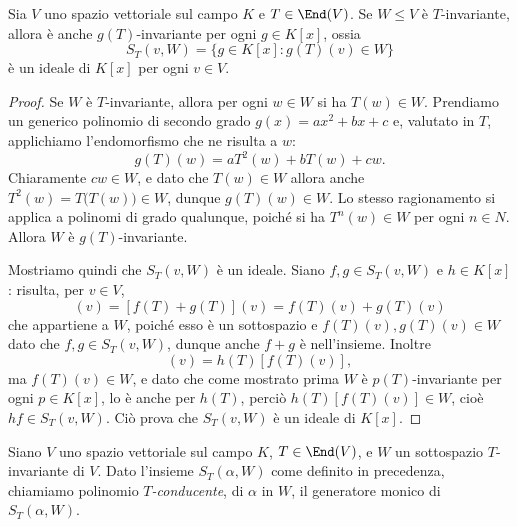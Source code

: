 \begin{lemma} \label{l:ideale-conducente}
	Sia $V$ uno spazio vettoriale sul campo $K$ e $T\in\End(V)$.
	Se $W\le V$ è $T$-invariante, allora è anche $g(T)$-invariante per ogni $g\in K[x]$, ossia
	\begin{equation*}
		S_T(v,W)=\{g\in K[x]\colon g(T)(v)\in W\}
	\end{equation*}
	è un ideale di $K[x]$ per ogni $v\in V$.
\end{lemma}
\begin{proof}
	Se $W$ è $T$-invariante, allora per ogni $w\in W$ si ha $T(w)\in W$.
	Prendiamo un generico polinomio di secondo grado $g(x)=ax^2+bx+c$ e, valutato in $T$, applichiamo l'endomorfismo che ne risulta a $w$:
	\begin{equation}
		g(T)(w)=aT^2(w)+bT(w)+cw.
	\end{equation}
	Chiaramente $cw\in W$, e dato che $T(w)\in W$ allora anche $T^2(w)=T\big(T(w)\big)\in W$, dunque $g(T)(w)\in W$.
	Lo stesso ragionamento si applica a polinomi di grado qualunque, poich\'e si ha $T^n(w)\in W$ per ogni $n\in N$.
	Allora $W$ è $g(T)$-invariante.

	Mostriamo quindi che $S_T(v,W)$ è un ideale.
	Siano $f,g\in S_T(v,W)$ e $h\in K[x]$: risulta, per $v\in V$,
	\begin{equation}
		[(f+g)(T)](v)=[f(T)+g(T)](v)=f(T)(v)+g(T)(v)
	\end{equation}
	che appartiene a $W$, poich\'e esso è un sottospazio e $f(T)(v),g(T)(v)\in W$ dato che $f,g\in S_T(v,W)$, dunque anche $f+g$ è nell'insieme.
	Inoltre
	\begin{equation*}
		[(hf)(T)](v)=h(T)[f(T)(v)],
	\end{equation*}
	ma $f(T)(v)\in W$, e dato che come mostrato prima $W$ è $p(T)$-invariante per ogni $p\in K[x]$, lo è anche per $h(T)$, perciò $h(T)[f(T)(v)]\in W$, cioè $hf\in S_T(v,W)$.
	Ciò prova che $S_T(v,W)$ è un ideale di $K[x]$.
\end{proof}

Siano $V$ uno spazio vettoriale sul campo $K$, $T\in\End(V)$, e $W$ un sottospazio $T$-invariante di $V$.
Dato l'insieme $S_T(\alpha,W)$ come definito in precedenza, chiamiamo polinomio \emph{$T$-conducente}, di $\alpha$ in $W$, il generatore monico di $S_T(\alpha,W)$.

